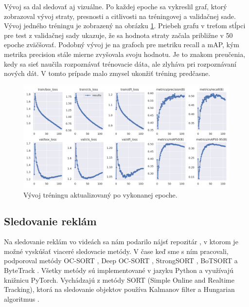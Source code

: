 Vývoj sa dal sledovať aj vizuálne. Po každej epoche sa vykreslil graf, ktorý zobrazoval vývoj straty, presnosti a citlivosti na tréningovej a validačnej sade. Vývoj jedného tréningu je zobrazený na obrázku \ref{img:graf}. Priebeh grafu v treťom stĺpci pre test z validačnej sady ukazuje, že sa hodnota straty začala približne v 50 epoche zväčšovať. Podobný vývoj je na grafoch pre metriku recall a mAP, kým metrika precision stále mierne zvyšovala svoju hodnotu. Je to znakom preučenia, kedy sa sieť naučila rozpoznávať trénovacie dáta, ale zlyháva pri rozpoznávaní nových dát. V tomto prípade malo zmysel ukonžiť tréning predčasne.
\\
\begin{figure}[ht]
    \centering
    \includegraphics[width=1\textwidth]{images/04/graf.png}
    \caption{Vývoj tréningu aktualizovaný po vykonanej epoche.}
    \label{img:graf}
\end{figure}

\subsection{Sledovanie reklám}


Na sledovanie reklám vo videách sa nám podarilo nájsť repozitár \cite{mikel}, v ktorom je možné vyskúšať viaceré sledovacie metódy. V čase keď sme s ním pracovali, podporoval metódy OC-SORT \cite{ocsort}, Deep OC-SORT \cite{deepocsort}, StrongSORT \cite{strongsort}, BoTSORT \cite{bot} a ByteTrack \cite{bytetrack}. Všetky metódy sú implementované v jazyku Python a využívajú knižnicu PyTorch. Vychádzajú z metódy SORT (Simple Online and Realtime Tracking), ktorá na sledovanie objektov používa Kalmanov filter a Hungarian algoritmus \cite{sort}.

